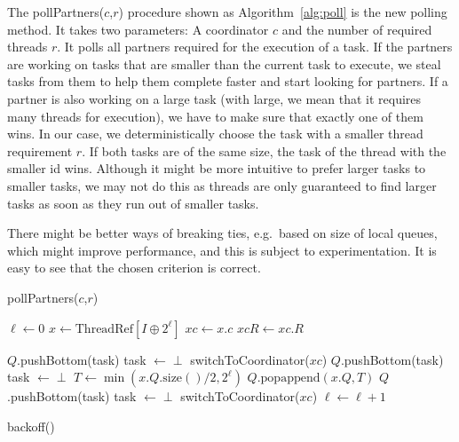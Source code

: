 \documentclass[preprint]{sigplanconf}
\begin{document}
The pollPartners($c$,$r$) procedure shown as Algorithm~\ref{alg:poll}
is the new polling method. It takes two parameters: A coordinator $c$
and the number of required threads $r$. It polls all partners required
for the execution of a task. If the partners are working on tasks that
are smaller than the current task to execute, we steal tasks from them
to help them complete faster and start looking for partners. If a
partner is also working on a large task (with large, we mean that it
requires many threads for execution), we have to make sure that
exactly one of them wins. In our case, we deterministically choose the
task with a smaller thread requirement $r$. If both tasks are of the
same size, the task of the thread with the smaller id wins. Although
it might be more intuitive to prefer larger tasks to smaller tasks, we
may not do this as threads are only guaranteed to find larger tasks as
soon as they run out of smaller tasks.

There might be better ways of breaking ties, e.g.\ based on size of
local queues, which might improve performance, and this is subject to
experimentation. It is easy to see that the chosen criterion is
correct.

\begin{algorithm}
\caption{pollPartners($c$,$r$)}\label{alg:poll}
\begin{algorithmic}[1]
\STATE $\ell\gets 0$
	\STATE $x \gets \mbox{ThreadRef}[I \oplus 2^{\ell}]$ 
	\STATE $xc \gets x.c$ 
	\STATE $xcR \gets xc.R$ 
	
				\STATE {}
					\STATE $Q$.pushBottom(task)
					\STATE task $\gets\perp$
				\ENDIF
				\STATE switchToCoordinator($xc$)
				\RETURN
			\ENDIF
			\STATE {}
			\STATE {}
				\STATE {}
						\STATE $Q$.pushBottom(task)
						\STATE task $\gets\perp$
					\ENDIF
					\STATE $T \gets\min(x.Q.\mbox{size}() / 2, 2^{\ell})$				
					\STATE $Q.\mbox{popappend}(x.Q, T)$
					\RETURN
				\ENDIF
			\ELSE
				\STATE {}
					\STATE $Q$.pushBottom(task)
					\STATE task $\gets\perp$
				\ENDIF
				\STATE switchToCoordinator($xc$)
				\RETURN
			\ENDIF
		\ENDIF
		\STATE {}
	\ENDIF
	\STATE $\ell\gets\ell+1$
\ENDWHILE

 \STATE backoff()
\ENDIF
\end{algorithmic}
\end{algorithm}
\end{document}
